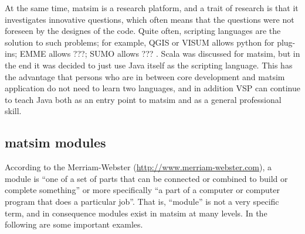 At the same time, \acrshort{matsim} is a research platform, and a trait of research is that it investigates innovative questions, which often means that the questions were not foreseen by the designes of the code.  Quite often, scripting languages are the solution to such problems; for example, QGIS or VISUM allows python \cite{...} for plug-ins; EMME allows ???; SUMO allows ??? .  Scala \cite{...} was discussed for \acrshort{matsim}, but in the end it was decided to just use Java itself as the scripting language.  This has the advantage that persons who are in between core development and \acrshort{matsim} application do not need to learn two languages, and in addition VSP can continue to teach Java both as an entry point to \acrshort{matsim} and as a general professional skill.


\subsection{\acrshort{matsim} modules}

According to the Merriam-Webster (\url{http://www.merriam-webster.com}), a module is
%
``one of a set of parts that can be connected or combined to build or complete something'' 
%
or more specifically
%
``a part of a computer or computer program that does a particular job''. 
%
That is, ``module'' is not a very specific term, and in consequence modules exist in \acrshort{matsim} at many levels.
%
In the following are some important examles.





